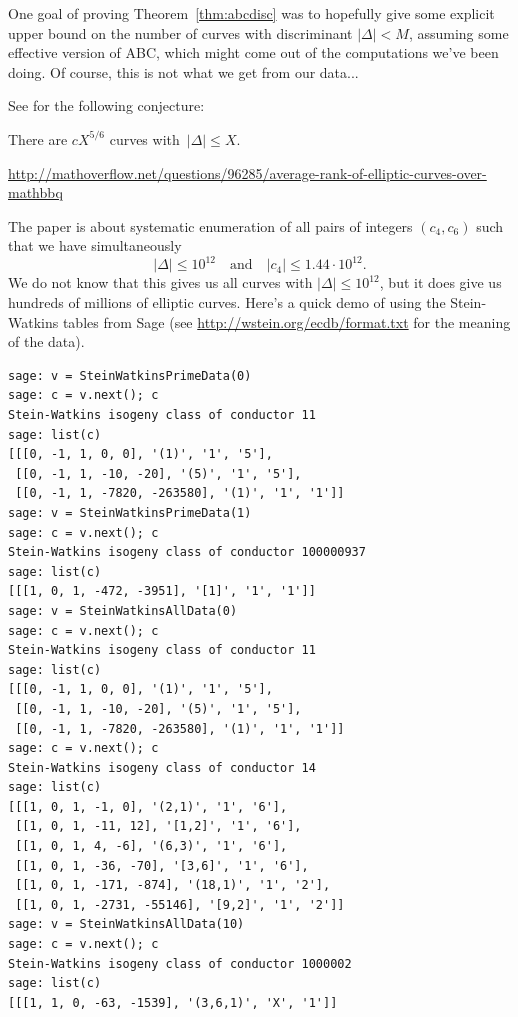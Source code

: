 \documentclass{book}
\begin{document}
One goal of proving Theorem~\ref{thm:abcdisc} was to hopefully
give some explicit upper bound on the number of curves with
discriminant $|\Delta| < M$, assuming some effective version
of ABC, which might come out of the computations we've been
doing.   Of course, this is not what we get from our data...

See \cite[\S3.4]{bmsw:bulletins} for the following conjecture:
\begin{conjecture}
There are $cX^{5/6}$ curves with~$|\Delta|\le X$.
\end{conjecture}
\url{http://mathoverflow.net/questions/96285/average-rank-of-elliptic-curves-over-mathbbq}



The paper \cite{stein-watkins:ants5} is about systematic
enumeration of all pairs of integers $(c_4,c_6)$ such that
we have simultaneously
$$
|\Delta| \leq 10^{12} \quad\text{and}\quad
|c_4|\leq 1.44\cdot 10^{12}.
$$
We do not know that this gives us all curves with $|\Delta|\leq 10^{12}$,
but it does give us hundreds of millions of elliptic curves.
Here's a quick demo of using the Stein-Watkins tables from Sage
(see \url{http://wstein.org/ecdb/format.txt} for the meaning of the data).
\begin{lstlisting}
sage: v = SteinWatkinsPrimeData(0)
sage: c = v.next(); c
Stein-Watkins isogeny class of conductor 11
sage: list(c)
[[[0, -1, 1, 0, 0], '(1)', '1', '5'],
 [[0, -1, 1, -10, -20], '(5)', '1', '5'],
 [[0, -1, 1, -7820, -263580], '(1)', '1', '1']]
sage: v = SteinWatkinsPrimeData(1)
sage: c = v.next(); c
Stein-Watkins isogeny class of conductor 100000937
sage: list(c)
[[[1, 0, 1, -472, -3951], '[1]', '1', '1']]
sage: v = SteinWatkinsAllData(0)
sage: c = v.next(); c
Stein-Watkins isogeny class of conductor 11
sage: list(c)
[[[0, -1, 1, 0, 0], '(1)', '1', '5'],
 [[0, -1, 1, -10, -20], '(5)', '1', '5'],
 [[0, -1, 1, -7820, -263580], '(1)', '1', '1']]
sage: c = v.next(); c
Stein-Watkins isogeny class of conductor 14
sage: list(c)
[[[1, 0, 1, -1, 0], '(2,1)', '1', '6'],
 [[1, 0, 1, -11, 12], '[1,2]', '1', '6'],
 [[1, 0, 1, 4, -6], '(6,3)', '1', '6'],
 [[1, 0, 1, -36, -70], '[3,6]', '1', '6'],
 [[1, 0, 1, -171, -874], '(18,1)', '1', '2'],
 [[1, 0, 1, -2731, -55146], '[9,2]', '1', '2']]
sage: v = SteinWatkinsAllData(10)
sage: c = v.next(); c
Stein-Watkins isogeny class of conductor 1000002
sage: list(c)
[[[1, 1, 0, -63, -1539], '(3,6,1)', 'X', '1']]
\end{lstlisting}

\end{document}
